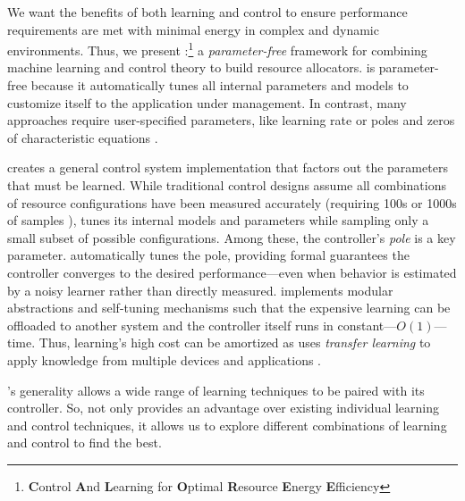 We want the benefits of both learning and control to ensure
performance requirements are met with minimal energy in complex and
dynamic environments.  Thus, we present
\SYSTEM{}:\footnote{\textbf{C}ontrol \textbf{A}nd \textbf{L}earning
  for \textbf{O}ptimal \textbf{R}esource \textbf{E}nergy
  \textbf{E}fficiency} a \emph{parameter-free} framework for combining
machine learning and control theory to build resource allocators.
\SYSTEM{} is parameter-free because it automatically tunes all
internal parameters and models to customize itself to the application
under management.  In contrast, many approaches require user-specified
parameters, like learning rate \cite{dubach2010,more} or poles and
zeros of characteristic equations \cite{ControlWare,more}.

\SYSTEM{} creates a general control system implementation that factors
out the parameters that must be learned.  While traditional control
designs assume all combinations of resource configurations have been
measured accurately (requiring 100s or 1000s of samples
\cite{sysid,FSE2015}), \SYSTEM{} tunes its internal models and
parameters while sampling only a small subset of possible
configurations.  Among these, the controller's \emph{pole} is a key
parameter.  \SYSTEM{} automatically tunes the pole, providing formal
guarantees the controller converges to the desired performance---even
when behavior is estimated by a noisy learner rather than directly
measured.  \SYSTEM{} implements modular abstractions and self-tuning
mechanisms such that the expensive learning can be offloaded to
another system and the controller itself runs in
constant---$O(1)$---time.  Thus, learning's high cost can be amortized
as \SYSTEM{} uses \emph{transfer learning} to apply knowledge from
multiple devices and applications \cite{transferlearning}.


\SYSTEM{}'s generality allows a wide range of learning techniques to
be paired with its controller.  So, \SYSTEM{} not only provides an
advantage over existing individual learning and control techniques, it
allows us to explore different combinations of learning and control to
find the best.

